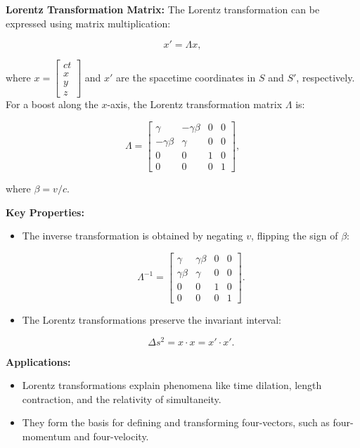 \documentclass{article}
\newcommand{\eqbox}[1]{\begin{tcolorbox}[colback=gray!10] #1 \end{tcolorbox}}
\newcommand{\conceptbox}[1]{\begin{tcolorbox}[colback=blue!10] #1 \end{tcolorbox}}
\begin{document}
\conceptbox{
\textbf{Lorentz Transformation Matrix:}
The Lorentz transformation can be expressed using matrix multiplication:
\eqbox{
\[
x' = \Lambda x,
\]
}
where \( x = \begin{bmatrix} ct \\ x \\ y \\ z \end{bmatrix} \) and \( x' \) are the spacetime coordinates in \( S \) and \( S' \), respectively. For a boost along the \( x \)-axis, the Lorentz transformation matrix \( \Lambda \) is:
\eqbox{
\[
\Lambda =
\begin{bmatrix}
\gamma & -\gamma \beta & 0 & 0 \\
-\gamma \beta & \gamma & 0 & 0 \\
0 & 0 & 1 & 0 \\
0 & 0 & 0 & 1
\end{bmatrix},
\]
}
where \( \beta = v/c \).
}

\conceptbox{
\textbf{Key Properties:}
\begin{itemize}
    \item The inverse transformation is obtained by negating \( v \), flipping the sign of \( \beta \):
    \eqbox{
    \[
    \Lambda^{-1} = \begin{bmatrix}
    \gamma & \gamma \beta & 0 & 0 \\
    \gamma \beta & \gamma & 0 & 0 \\
    0 & 0 & 1 & 0 \\
    0 & 0 & 0 & 1
    \end{bmatrix}.
    \]
    }
    \item The Lorentz transformations preserve the invariant interval:
    \eqbox{
    \[
    \Delta s^2 = x \cdot x = x'\cdot x'.
    \]
    }
\end{itemize}
}

\conceptbox{
\textbf{Applications:}
\begin{itemize}
    \item Lorentz transformations explain phenomena like time dilation, length contraction, and the relativity of simultaneity.
    \item They form the basis for defining and transforming four-vectors, such as four-momentum and four-velocity.
\end{itemize}
}
\end{document}
